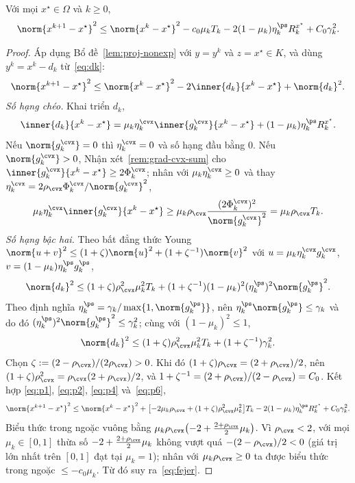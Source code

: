 \begin{lemma}\label{lem:fejer}
Với mọi $x^\star\in\Omega$ và $k\ge 0$,
\begin{equation}\label{eq:fejer}
\norm{x^{k+1}-x^\star}^2\le\norm{x^k-x^\star}^2-c_0\mu_k T_k-2(1-\mu_k)\eta^{\ps}_k R^{x^\star}_k+C_0\gamma_k^2 .
\end{equation}
\end{lemma}
\begin{proof}
Áp dụng Bổ đề~\ref{lem:proj-nonexp} với $y=y^k$ và $z=x^\star\in K$, và dùng
$y^k=x^k-d_k$ từ~\eqref{eq:dk}:
\begin{equation}\label{eq:p1}
\norm{x^{k+1}-x^\star}^2\le\norm{x^k-x^\star}^2-2\inner{d_k}{x^k-x^\star}+\norm{d_k}^2 .
\end{equation}
\emph{Số hạng chéo.} Khai triển $d_k$,
\begin{equation}\label{eq:p2}
\inner{d_k}{x^k-x^\star}=\mu_k\eta^{\cvx}_k\inner{g^{\cvx}_k}{x^k-x^\star}+(1-\mu_k)\eta^{\ps}_k R^{x^\star}_k .
\end{equation}
Nếu $\norm{g^{\cvx}_k}=0$ thì $\eta^{\cvx}_k=0$ và số hạng đầu bằng $0$. Nếu
$\norm{g^{\cvx}_k}>0$, Nhận xét~\ref{rem:grad-cvx-sum} cho
$\inner{g^{\cvx}_k}{x^k-x^\star}\ge 2\Phi^{\cvx}_k$; nhân với
$\mu_k\eta^{\cvx}_k\ge 0$ và thay
$\eta^{\cvx}_k=2\rho_{\cvx}\Phi^{\cvx}_k/\norm{g^{\cvx}_k}^2$,
\begin{equation}\label{eq:p4}
\mu_k\eta^{\cvx}_k\inner{g^{\cvx}_k}{x^k-x^\star}\ge\mu_k\rho_{\cvx}\frac{(2\Phi^{\cvx}_k)^2}{\norm{g^{\cvx}_k}^2}=\mu_k\rho_{\cvx}T_k .
\end{equation}
\emph{Số hạng bậc hai.} Theo bất đẳng thức Young
$\norm{u+v}^2\le(1+\zeta)\norm{u}^2+(1+\zeta^{-1})\norm{v}^2$ với
$u=\mu_k\eta^{\cvx}_k g^{\cvx}_k$, $v=(1-\mu_k)\eta^{\ps}_k g^{\ps}_k$,
\[
\norm{d_k}^2\le(1+\zeta)\rho_{\cvx}^2\mu_k^2 T_k+(1+\zeta^{-1})(1-\mu_k)^2(\eta^{\ps}_k)^2\norm{g^{\ps}_k}^2 .
\]
Theo định nghĩa $\eta^{\ps}_k=\gamma_k/\max\{1,\norm{g^{\ps}_k}\}$, nên
$\eta^{\ps}_k\norm{g^{\ps}_k}\le\gamma_k$ và do đó
$(\eta^{\ps}_k)^2\norm{g^{\ps}_k}^2\le\gamma_k^2$; cùng với $(1-\mu_k)^2\le 1$,
\begin{equation}\label{eq:p6}
\norm{d_k}^2\le(1+\zeta)\rho_{\cvx}^2\mu_k^2 T_k+(1+\zeta^{-1})\gamma_k^2 .
\end{equation}
Chọn $\zeta:=(2-\rho_{\cvx})/(2\rho_{\cvx})>0$. Khi đó
$(1+\zeta)\rho_{\cvx}=(2+\rho_{\cvx})/2$, nên
$(1+\zeta)\rho_{\cvx}^2=\rho_{\cvx}(2+\rho_{\cvx})/2$, và
$1+\zeta^{-1}=(2+\rho_{\cvx})/(2-\rho_{\cvx})=C_0$. Kết hợp
\eqref{eq:p1}, \eqref{eq:p2}, \eqref{eq:p4} và~\eqref{eq:p6},
\[
\norm{x^{k+1}-x^\star}^2\le\norm{x^k-x^\star}^2+\bigl[-2\mu_k\rho_{\cvx}+(1+\zeta)\rho_{\cvx}^2\mu_k^2\bigr]T_k-2(1-\mu_k)\eta^{\ps}_k R^{x^\star}_k+C_0\gamma_k^2 .
\]
Biểu thức trong ngoặc vuông bằng
$\mu_k\rho_{\cvx}\bigl(-2+\tfrac{2+\rho_{\cvx}}{2}\mu_k\bigr)$. Vì $\rho_{\cvx}<2$, với
mọi $\mu_k\in[0,1]$ thừa số $-2+\tfrac{2+\rho_{\cvx}}{2}\mu_k$ không vượt quá
$-(2-\rho_{\cvx})/2<0$ (giá trị lớn nhất trên $[0,1]$ đạt tại $\mu_k=1$); nhân với
$\mu_k\rho_{\cvx}\ge0$ ta được biểu thức trong ngoặc $\le -c_0\mu_k$. Từ đó suy ra~\eqref{eq:fejer}.
\end{proof}

